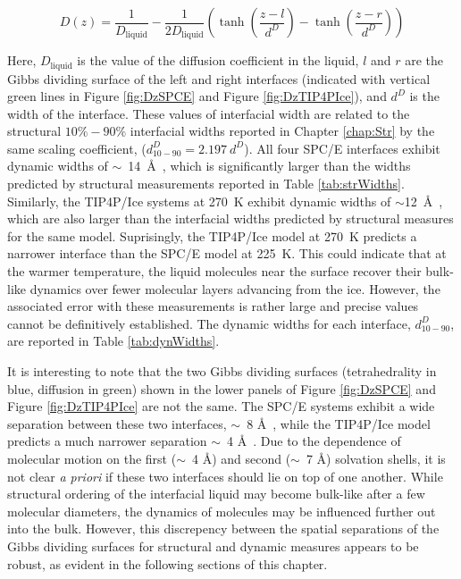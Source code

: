 \begin{equation}\label{eq:Dfit}
  D(z) = \frac{1}{D_\mathrm{liquid}} - \frac{1}{2D_\mathrm{liquid}} \left(
      \tanh \left( \frac{z-l}{d^D} \right) - \tanh \left( \frac{z-r}{d^D} \right) \right)
\end{equation}
  
Here, $D_\mathrm{liquid}$ is the value of the diffusion coefficient in
the liquid, $l$ and $r$ are the Gibbs dividing surface of the left and
right interfaces (indicated with vertical green lines in Figure
\ref{fig:DzSPCE} and Figure \ref{fig:DzTIP4PIce}), and $d^{D}$ is the
width of the interface. These values of interfacial width are related
to the structural $10\%-90\%$ interfacial widths reported in Chapter
\ref{chap:Str} by the same scaling coefficient,
($d_\mathrm{10-90}^{D} = 2.197~d^{D}$). All four SPC/E interfaces
exhibit dynamic widths of $\sim$~14~\AA~, which is significantly
larger than the widths predicted by structural measurements reported
in Table \ref{tab:strWidths}. Similarly, the TIP4P/Ice systems at
270~K exhibit dynamic widths of $\sim$12~\AA~, which are also larger
than the interfacial widths predicted by structural measures for the
same model. Suprisingly, the TIP4P/Ice model at 270~K predicts a
narrower interface than the SPC/E model at 225~K. This could indicate
that at the warmer temperature, the liquid molecules near the surface
recover their bulk-like dynamics over fewer molecular layers advancing
from the ice. However, the associated error with these measurements is
rather large and precise values cannot be definitively
established. The dynamic widths for each interface,
$d_\mathrm{10-90}^{D}$, are reported in Table \ref{tab:dynWidths}.

It is interesting to note that the two Gibbs dividing surfaces
(tetrahedrality in blue, diffusion in green) shown in the lower panels
of Figure \ref{fig:DzSPCE} and Figure \ref{fig:DzTIP4PIce} are not the
same. The SPC/E systems exhibit a wide separation between these two
interfaces, $\sim$~8 \AA~, while the TIP4P/Ice model predicts a much
narrower separation $\sim$~4 \AA~. Due to the dependence of molecular
motion on the first ($\sim$~4 \AA) and second ($\sim$~7 \AA) solvation
shells, it is not clear \textit{a priori} if these two interfaces
should lie on top of one another. While structural ordering of the
interfacial liquid may become bulk-like after a few molecular
diameters, the dynamics of molecules may be influenced further out
into the bulk. However, this discrepency between the spatial
separations of the Gibbs dividing surfaces for structural and dynamic
measures appears to be robust, as evident in the following sections of
this chapter.

